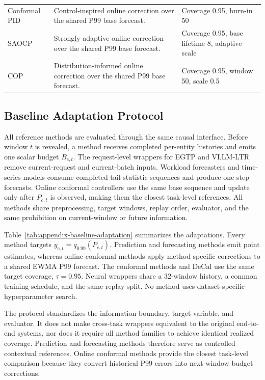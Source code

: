 \documentclass[sigplan,10pt, anonymous]{acmart}
\begin{document}
\begin{table}[t]
\begin{tabular}{
  >{\RaggedRight\arraybackslash}p{}
  >{\RaggedRight\arraybackslash}p{}
  >{\RaggedRight\arraybackslash}p{}}
Conformal PID &
Control-inspired online correction over the shared P99 base forecast. &
Coverage 0.95, burn-in 50 \\

SAOCP &
Strongly adaptive online correction over the shared P99 base forecast. &
Coverage 0.95, base lifetime 8, adaptive scale \\

COP &
Distribution-informed online correction over the shared P99 base forecast. &
Coverage 0.95, window 50, scale 0.5 \\
\bottomrule
\end{tabular}
\end{table}

\subsection{Baseline Adaptation Protocol}
\label{app:baseline_proxy}

All reference methods are evaluated through the same causal interface. Before window $t$ is revealed, a method receives completed per-entity histories and emits one scalar budget $B_{c,t}$. The request-level wrappers for EGTP and VLLM-LTR remove current-request and current-batch inputs. Workload forecasters and time-series models consume completed tail-statistic sequences and produce one-step forecasts. Online conformal controllers use the same base sequence and update only after $P_{c,t}$ is observed, making them the closest task-level references. All methods share preprocessing, target windows, replay order, evaluator, and the same prohibition on current-window or future information.

Table~\ref{tab:appendix-baseline-adaptation} summarizes the adaptations. Every method targets $y_{c,t}=q_{0.99}(P_{c,t})$. Prediction and forecasting methods emit point estimates, whereas online conformal methods apply method-specific corrections to a shared EWMA P99 forecast. The conformal methods and DeCal use the same target coverage, $\tau=0.95$. Neural wrappers share a 32-window history, a common training schedule, and the same replay split. No method uses dataset-specific hyperparameter search.

The protocol standardizes the information boundary, target variable, and evaluator. It does not make cross-task wrappers equivalent to the original end-to-end systems, nor does it require all method families to achieve identical realized coverage. Prediction and forecasting methods therefore serve as controlled contextual references. Online conformal methods provide the closest task-level comparison because they convert historical P99 errors into next-window budget corrections.
\end{document}
